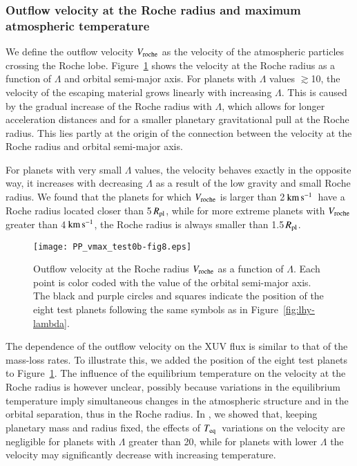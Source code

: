 \documentclass{aa}
\def\Teq{$T_{\rm eq}$}
\def\Rpl{$R_{\rm pl}$}
\def\kms{$\rm km\,s^{-1}$}
\begin{document}
\subsubsection{Outflow velocity at the Roche radius and maximum atmospheric temperature}\label{sec:velocity}
%
We define the outflow velocity $V_{\rm roche}$ as the velocity of the atmospheric particles crossing the Roche lobe. Figure~\ref{fig:vmax-lambda} shows the velocity at the Roche radius as a function of $\Lambda$ and orbital semi-major axis. For planets with $\Lambda$ values $\gtrsim$10, the velocity of the escaping material grows linearly with increasing $\Lambda$. This is caused by the gradual increase of the Roche radius with $\Lambda$, which allows for longer acceleration distances and for a smaller planetary gravitational pull at the Roche radius. This lies partly at the origin of the connection between the velocity at the Roche radius and orbital semi-major axis.

For planets with very small $\Lambda$ values, the velocity behaves exactly in the opposite way, it increases with decreasing $\Lambda$ as a result of the low gravity and small Roche radius. We found that the planets for which $V_{\rm roche}$ is larger than 2\,\kms\ have a Roche radius located closer than 5\,\Rpl, while for more extreme planets with $V_{\rm roche}$ greater than 4\,\kms, the Roche radius is always smaller than 1.5\,\Rpl.
\begin{figure}
\texttt{[image: PP\_vmax\_test0b-fig8.eps]}
\caption{{Outflow velocity at the Roche radius $V_{\rm roche}$ as
a function of $\Lambda$. Each point is color coded with the value
of the orbital semi-major axis. The black and purple circles and
squares indicate the position of the eight test planets following
the same symbols as in Figure~\ref{fig:lhy-lambda}.}}
\label{fig:vmax-lambda}
\end{figure}

The dependence of the outflow velocity on {the} XUV flux is
similar to that of the mass-loss rates. To illustrate this, we
added the position of the eight test planets to
Figure~\ref{fig:vmax-lambda}. The influence of the equilibrium
temperature on the velocity at the Roche radius is however
unclear, possibly because variations in the equilibrium
temperature imply simultaneous changes in the atmospheric
structure and in the orbital separation, thus in the Roche radius.
In \citet{kubyshkina2018}, we showed that, keeping planetary mass
and radius fixed, the effects of \Teq\ variations on the velocity
are negligible for planets with $\Lambda$ greater than 20, while
for planets with lower $\Lambda$ the velocity may significantly
decrease with increasing temperature.
\end{document}
